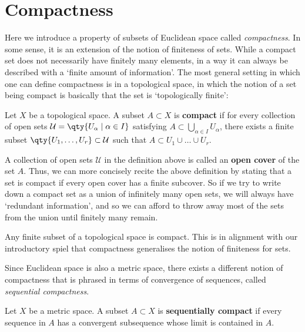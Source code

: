  \section{Compactness}
 Here we introduce a property of subsets of Euclidean space called \emph{compactness}. In some sense, it is an extension of the notion of finiteness of sets. While a compact set does not necessarily have finitely many elements, in a way it can always be described with a `finite amount of information'. The most general setting in which one can define compactness is in a topological space, in which the notion of a set being compact is basically that the set is `topologically finite':
 \begin{definition}
   Let \( X \) be a topological space. A subset \( A\subset X \) is \textbf{compact} if for every collection of open sets \( \mathcal{U}=\qty{U_\alpha\mid \alpha\in I} \) satisfying \( A\subset\bigcup_{\alpha\in I}U_\alpha \), there exists a finite subset \( \qty{U_1,\dots,U_r}\subset\mathcal{U} \) such that \( A\subset U_1\cup\dots\cup U_r \).
 \end{definition}

 A collection of open sets \( \mathcal{U} \) in the definition above is called an \textbf{open cover} of the set \( A \). Thus, we can more concisely recite the above definition by stating that a set is compact if every open cover has a finite subcover. So if we try to write down a compact set as a union of infinitely many open sets, we will always have `redundant information', and so we can afford to throw away most of the sets from the union until finitely many remain.

 \vspace{3mm}

 Any finite subset of a topological space is compact. This is in alignment with our introductory spiel that compactness generalises the notion of finiteness for sets.

 \vspace{3mm}

 Since Euclidean space is also a metric space, there exists a different notion of compactness that is phrased in terms of convergence of sequences, called \emph{sequential compactness}.

 \begin{definition}
   Let \( X \) be a metric space. A subset \( A\subset X \) is \textbf{sequentially compact} if every sequence in \( A \) has a convergent subsequence whose limit is contained in \( A \).
 \end{definition}

